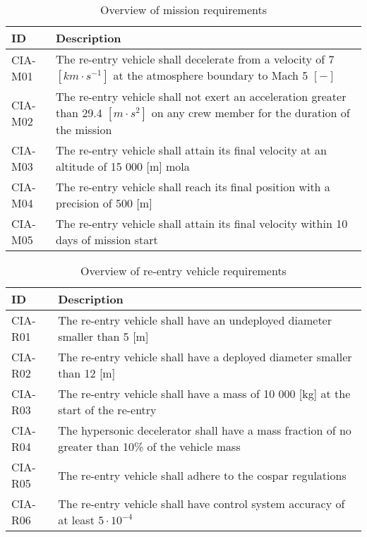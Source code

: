 \begin{table}[h]
	\caption{Overview of mission requirements}
	\label{tab:misreq} 
	\begin{tabular}{|p{}|p{}|}
    \hline
    \textbf{ID}          & \textbf{Description}                                                                                                      \\ \hline \hline
    CIA-M01& The re-entry vehicle shall decelerate from a velocity of 7 $[km\cdot s ^{-1}]$ at the atmosphere boundary to Mach 5 $[-]$  \\ \hline
    CIA-M02 & The re-entry vehicle shall not exert an acceleration greater than 29.4 $[m \cdot s^{2}]$ on any crew member for the duration of the mission			\\ \hline
    	CIA-M03 & The re-entry vehicle shall attain its final velocity at an altitude of 15 000 [m] \gls{mola} \\ \hline
    	CIA-M04 & The re-entry vehicle shall reach its final position with a precision of 500 [m]\\ \hline
    	CIA-M05 & The re-entry vehicle shall attain its final velocity within 10 days of mission start \\ \hline
    \end{tabular}
\end{table}

\begin{table}[h]
	\caption{Overview of re-entry vehicle requirements} 
	\label{tab:vehreq}
	\begin{tabular}{|p{}|p{}|}
	    \hline
	    \textbf{ID}          & \textbf{Description}                                                                                                     \\ \hline \hline
	CIA-R01 & The re-entry vehicle shall have an undeployed diameter smaller than 5 [m]                         				            \\ \hline
	CIA-R02 & The re-entry vehicle shall have a deployed diameter smaller than 12 [m]                         				            \\ \hline	
	CIA-R03 & The re-entry vehicle shall have a mass of 10 000 [kg] at the start of the re-entry                       				            \\ \hline
	CIA-R04 & The hypersonic decelerator shall have a mass fraction of no greater than 10\% of the vehicle mass  \\ \hline
	CIA-R05 &  The re-entry vehicle shall adhere to the \gls{cospar} regulations \\ \hline
	CIA-R06 &  The re-entry vehicle shall have control system accuracy of at least $5\cdot 10^{-4}$  \\ \hline
    \end{tabular}
\end{table}




